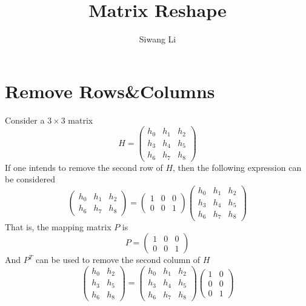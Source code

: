 \documentclass[9pt,twocolumn]{extarticle}
\author{Siwang Li}
\title{Matrix Reshape}
\begin{document}
\maketitle

\setlength{\parskip}{0.5ex}

\section{Remove Rows\&Columns}
Consider a $3\times3$ matrix
\[
H = \left( \begin{array}{ccc}
    h_0 & h_1 & h_2\\
    h_3 & h_4 & h_5\\
    h_6 & h_7 & h_8
  \end{array} \right)
\]
If one intends to remove the second row of $H$, then the following expression
can be considered
\[
\left( \begin{array}{ccc}
    h_0 & h_1 & h_2\\
    h_6 & h_7 & h_8
  \end{array} \right) = 
\left( \begin{array}{ccc}
    1 & 0& 0\\
    0 & 0& 1
  \end{array} \right)
\left( \begin{array}{ccc}
    h_0 & h_1 & h_2\\
    h_3 & h_4 & h_5\\
    h_6 & h_7 & h_8
  \end{array} \right)
\]
That is, the mapping matrix $P$ is
\[
P = \left( \begin{array}{ccc}
    1 & 0& 0\\
    0 & 0& 1
  \end{array} \right)
\]
And $P^T$ can be used to remove the second column of $H$
\[
\left( \begin{array}{cc}
    h_0 & h_2\\
    h_3 & h_5\\
    h_6 & h_8
  \end{array} \right) = 
\left( \begin{array}{ccc}
    h_0 & h_1 & h_2\\
    h_3 & h_4 & h_5\\
    h_6 & h_7 & h_8
  \end{array} \right)
\left( \begin{array}{cc}
    1 & 0\\
    0 & 0\\
    0 & 1
  \end{array} \right)
\]
\end{document}
